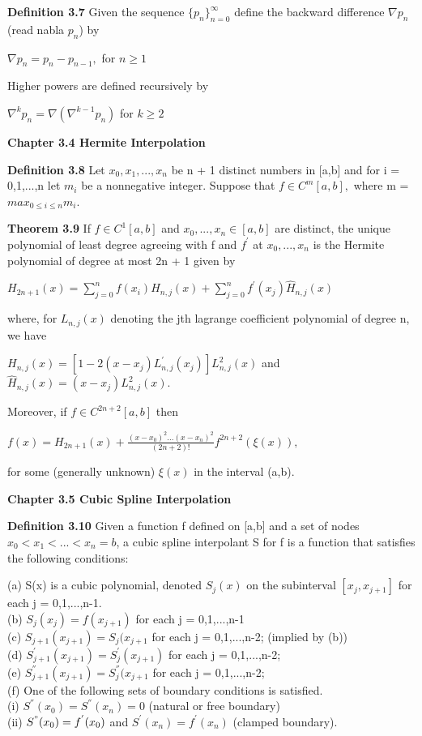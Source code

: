 \documentclass{article}
\begin{document}
\textbf {Definition 3.7} Given the sequence $\{p_n\}_{n=0}^\infty$ define the backward difference $\nabla p_n$ (read nabla $p_n$) by 
\begin{center}
$\nabla p_n = p_n - p_{n-1},$ for $n \geq 1$
\end{center}
Higher powers are defined recursively by
\begin{center}
$\nabla^k p_n = \nabla (\nabla^{k-1} p_n)$ for $k \geq 2$

\textbf {Chapter 3.4 Hermite Interpolation}

\textbf {Definition 3.8} Let $x_0, x_1,...,x_n$ be n + 1 distinct numbers in [a,b] and for i = 0,1,...,n let $m_i$ be a nonnegative integer. Suppose that $f \in C^m [a,b],$ where m = $max_{0 \leq i \leq n} m_i$.

\textbf {Theorem 3.9} If $f \in C^1 [a,b]$ and $x_0,...,x_n \in [a,b]$ are distinct, the unique polynomial of least degree agreeing with f and $f^{'}$ at $x_0,...,x_n$ is the Hermite polynomial of degree at most 2n + 1 given by
\begin{center}
$H_{2n + 1} (x) = \sum_{j=0}^{n} f(x_i) H_{n,j}(x) + \sum_{j=0}^{n} f^{'} (x_j) \hat{H}_{n,j} (x)$
\end{center}
\end{center}
where, for $L_{n,j}(x)$ denoting the jth lagrange coefficient polynomial of degree n, we have \
\begin{center}
$H_{n,j}(x) = [1 - 2(x-x_j)L_{n,j}^{'} (x_j)]L_{n,j}^{2}(x)$ and $\hat{H}_{n,j}(x) = (x-x_j)L_{n,j}^2(x).$
\end{center}
Moreover, if $f \in C^{2n + 2} [a,b]$ then
\begin{center}
$f(x) = H_{2n+1} (x) + \frac{(x-x_0)^2 \dots (x-x_n)^2}{(2n + 2)!} f^{2n + 2} (\xi(x)),$
\end{center}
for some (generally unknown) $\xi(x)$ in the interval (a,b).

\textbf {Chapter 3.5 Cubic Spline Interpolation}

\textbf {Definition 3.10} Given a function f defined on [a,b] and a set of nodes $x_0 < x_1 < ... < x_n = b$, a cubic spline interpolant S for f is a function that satisfies the following conditions:
\begin{center}
(a) S(x) is a cubic polynomial, denoted $S_j(x)$ on the subinterval $[x_j, x_{j+1}]$ for each j = 0,1,...,n-1. \\
(b) $S_j(x_j) = f(x_{j+1})$ for each j = 0,1,...,n-1 \\
(c) $S_{j+1}(x_{j+1}) = S_j(x_{j+1}$ for each j = 0,1,...,n-2; (implied by (b)) \\
(d) $S^{'}_{j+1}(x_{j+1}) = S^{'}_j(x_{j+1})$ for each j = 0,1,...,n-2; \\
(e) $S^{''}_{j+1}(x_{j+1}) = S^{''}_j(x_{j+1}$ for each j = 0,1,...,n-2; \\
(f) One of the following sets of boundary conditions is satisfied. \\
(i) $S^{''}(x_0) = S^{''}(x_n) = 0$ (natural or free boundary) \\
(ii) $S^{"}(x_0) = f^{'}(x_0)$ and $S^{'}(x_n) = f^{'}(x_n)$ (clamped boundary). 
\end{center}
\end{document}
